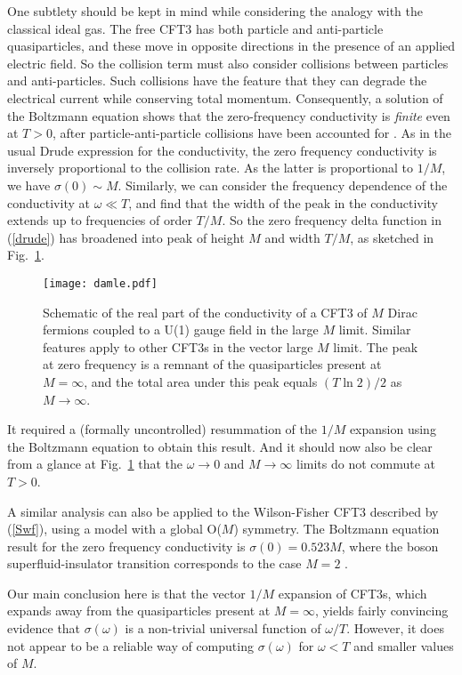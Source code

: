 \documentclass[10pt, oneside]{book}
\begin{document}
\begin{doublespace}
One subtlety should be kept in mind while considering the analogy with the classical ideal gas. The free CFT3 has both particle and anti-particle quasiparticles, and these move in opposite directions in the presence of an applied electric field. So the collision term must also consider collisions between particles and anti-particles. Such collisions have the feature that they can degrade the electrical current while conserving total momentum. Consequently, a solution of the Boltzmann equation
shows that the zero-frequency conductivity is {\em finite\/} even at $T>0$, after particle-anti-particle collisions have been accounted for \cite{Damle97,ssbook}. 
As in the usual Drude expression for the conductivity, the zero frequency conductivity is inversely proportional to the collision rate. As the latter is proportional
to $1/M$, we have $\sigma (0) \sim M$. Similarly, we can consider the frequency dependence of the conductivity at $\omega \ll T$, and find that the 
width of the peak in the conductivity extends up to frequencies of order $T/M$.
So the zero frequency delta function in (\ref{drude}) has broadened into peak of height $M$ and width $T/M$, as sketched in Fig.~\ref{fig:damle}. 
\begin{figure}
\centering
\texttt{[image: damle.pdf]}
\caption{\label{fig:damle} Schematic of the real part of the conductivity of a CFT3 of $M$ Dirac fermions coupled to a U(1) gauge field
in the large $M$ limit. Similar features apply to other CFT3s in the vector large $M$ limit. The peak at zero frequency is a 
remnant of the quasiparticles present at $M=\infty$, and the total area under this peak equals $(T \ln 2)/2$ as $M \rightarrow \infty$.}
\end{figure}
It required a (formally uncontrolled) resummation of the $1/M$ expansion using the Boltzmann equation to obtain this result.
And it should now also be clear from a glance at Fig.~\ref{fig:damle} that the $\omega \rightarrow 0$ and $M \rightarrow \infty$ limits do not commute
at $T>0$.

A similar analysis can also be applied to the Wilson-Fisher CFT3 described by (\ref{Swf}), using a model with a global O($M$) symmetry. 
The Boltzmann equation result for the zero frequency conductivity is $\sigma (0) = 0.523 M$, where the boson superfluid-insulator transition corresponds to the case $M=2$ \cite{Sachdev97,Krempa12}.

Our main conclusion here is that the vector $1/M$ expansion of CFT3s, which expands away from the quasiparticles present at $M=\infty$, 
yields fairly convincing evidence that $\sigma (\omega)$ is a non-trivial universal function of $\omega/T$. However, it does not appear to be a reliable
way of computing $\sigma (\omega)$ for $\omega < T$ and smaller values of $M$.


\end{doublespace}
\end{document}
